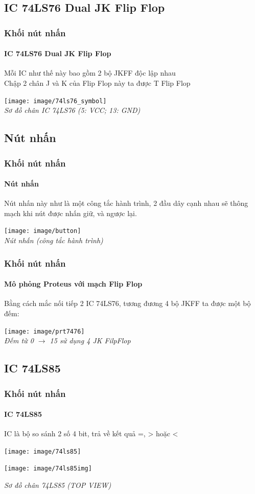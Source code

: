 \documentclass[12pt,a4paper]{beamer}
\begin{document}
\subsection{IC 74LS76 Dual JK Flip Flop}
\begin{frame}
	
	\frametitle{Khối nút nhấn}
	\framesubtitle{IC 74LS76 Dual JK Flip Flop}
	
	Mỗi IC như thế này bao gồm 2 bộ JKFF độc lập nhau\\
	Chập 2 chân J và K của Flip Flop này ta được T Flip Flop
	\begin{center}
		\texttt{[image: image/74ls76\_symbol]}\\
	\textit{Sơ đồ chân IC 74LS76 (5: VCC; 13: GND)}
	\end{center}
\end{frame}
\subsection{Nút nhấn}
\begin{frame}
	\frametitle{Khối nút nhấn}
	\framesubtitle{Nút nhấn}
	
	Nút nhấn này như là một công tắc hành trình, 2 đầu dây cạnh nhau sẽ thông mạch khi nút được nhấn giữ, và ngược lại.
	\begin{center}
		\texttt{[image: image/button]}\\
		\textit{Nút nhấn (công tắc hành trình)}
	\end{center}
\end{frame}

\begin{frame}
	\frametitle{Khối nút nhấn}
	\framesubtitle{Mô phỏng Proteus với mạch Flip Flop }
	Bằng cách mắc nối tiếp 2 IC 74LS76, tương đương 4 bộ JKFF ta được một bộ đếm:
	\begin{center}
		\texttt{[image: image/prt7476]}\\
		\textit{Đếm từ 0 $\to$ 15 sử dụng 4 JK FilpFlop}
	\end{center}
\end{frame}
\subsection{IC 74LS85}
\begin{frame}
	\frametitle{Khối nút nhấn}
	\framesubtitle{IC 74LS85}
	
	IC là bộ so sánh 2 số 4 bit, trả về kết quả =, > hoặc <
	\begin{minipage}{6cm}
		\begin{center}
			\texttt{[image: image/74ls85]}
		\end{center}
	\end{minipage}
	\hfill
	\begin{minipage}{4cm}
		\begin{flushleft}
			\texttt{[image: image/74ls85img]}
		\end{flushleft}
	\end{minipage}
	\begin{center}
		\textit{Sơ đồ chân 74LS85 (TOP VIEW)}
	\end{center}
\end{frame}
\end{document}
